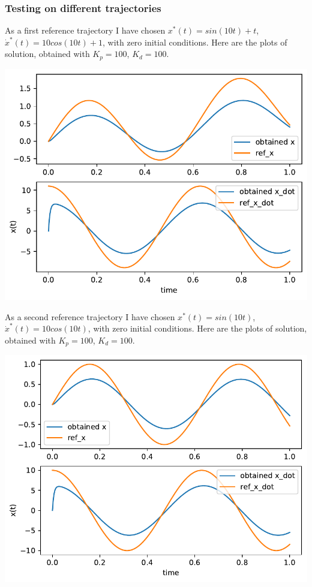 \documentclass[a4paper,12pt]{article}
\begin{document}
        \subsubsection*{Testing on different trajectories}
            As a first reference trajectory I have chosen $x^*(t)=sin(10t) + t$, 
            $\dot{x}^*(t) = 10 cos(10t)+1$, with zero initial conditions. Here are the plots 
            of solution, obtained with $K_p = 100$, $K_d = 100$.
            \begin{center}
                \includegraphics[width = 0.8\linewidth]{2a_tr1.pdf}
            \end{center}
            As a second reference trajectory I have chosen $x^*(t)=sin(10t)$, 
            $\dot{x}^*(t) = 10 cos(10t)$, with zero initial conditions. Here are the plots 
            of solution, obtained with $K_p = 100$, $K_d = 100$.
            \begin{center}
                \includegraphics[width = 0.8\linewidth]{2a_tr2.pdf}
            \end{center}
\end{document}
